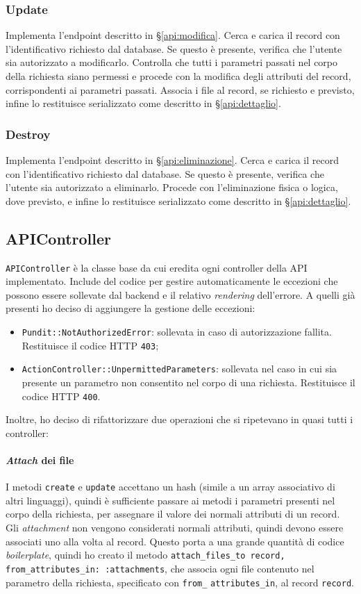 \subsubsection{Update}
Implementa l'endpoint descritto in \S \ref{api:modifica}. Cerca e carica il record con l'identificativo richiesto dal database. Se questo è presente, verifica che l'utente sia autorizzato a modificarlo. Controlla che tutti i parametri passati nel corpo della richiesta siano permessi e procede con la modifica degli attributi del record, corrispondenti ai parametri passati. Associa i file al record, se richiesto e previsto, infine lo restituisce serializzato come descritto in \S \ref{api:dettaglio}.

\subsubsection{Destroy}
Implementa l'endpoint descritto in \S \ref{api:eliminazione}. Cerca e carica il record con l'identificativo richiesto dal database. Se questo è presente, verifica che l'utente sia autorizzato a eliminarlo. Procede con l'eliminazione fisica o logica, dove previsto, e infine lo restituisce serializzato come descritto in \S \ref{api:dettaglio}.

\subsection{APIController}
\verb|APIController| è la classe base da cui eredita ogni controller della API implementato. Include del codice per gestire automaticamente le eccezioni che possono essere sollevate dal backend e il relativo \emph{rendering} dell'errore. A quelli già presenti ho deciso di aggiungere la gestione delle eccezioni:
\begin{itemize}
	\item \verb|Pundit::NotAuthorizedError|: sollevata in caso di autorizzazione fallita. Restituisce il codice HTTP \verb|403|;
	\item \verb|ActionController::UnpermittedParameters|: sollevata nel caso in cui sia presente un parametro non consentito nel corpo di una richiesta. Restituisce il codice HTTP \verb|400|.
\end{itemize}
Inoltre, ho deciso di rifattorizzare due operazioni che si ripetevano in quasi tutti i controller:

\paragraph{\emph{Attach} dei file} I metodi \verb|create| e \verb|update| accettano un hash (simile a un array associativo di altri linguaggi), quindi è sufficiente passare ai metodi i parametri presenti nel corpo della richiesta, per assegnare il valore dei normali attributi di un record. Gli \emph{attachment} non vengono considerati normali attributi, quindi devono essere associati uno alla volta al record. Questo porta a una grande quantità di codice \emph{boilerplate}, quindi ho creato il metodo \texttt{attach_files_to record, from_attributes_in: :attachments}, che associa ogni file contenuto nel parametro della richiesta, specificato con \verb|from_| \verb|attributes_in|, al record \verb|record|.

